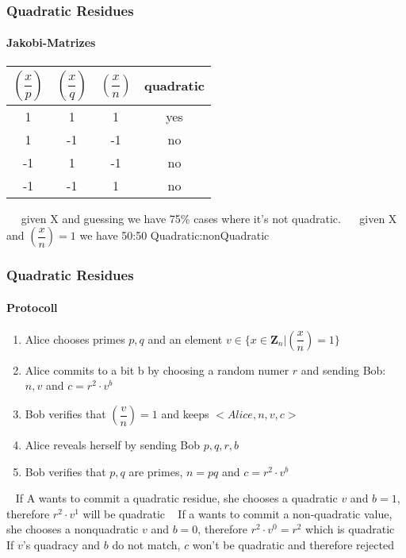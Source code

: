 \begin{frame}
	\frametitle{Quadratic Residues}
	\framesubtitle{Jakobi-Matrizes}
	\begin{LARGE}
		\begin{center}
			\begin{tabular}{|c|c|c|c|}
				$(\dfrac{x}{p})$&$(\dfrac{x}{q})$ &$(\dfrac{x}{n})$& quadratic \\ 
				\hline 
				1 & 1  & 1  & yes \\ 
				\hline 
				1 & -1  & -1  & no \\ 
				\hline 	
				-1 & 1  & -1  & no \\ 
				\hline 	
				-1 & -1  & 1  & no \\ 
				\hline 
			\end{tabular} 
		\end{center}
	\end{LARGE}
~\newline ~\newline
	given X and guessing we have 75\% cases where it's not quadratic. 
	~\newline ~\newline
	given X and $(\dfrac{x}{n})=1$ we have 50:50 Quadratic:nonQuadratic 
\end{frame}

\begin{frame}
	\frametitle{Quadratic Residues}
	\framesubtitle{Protocoll}
	\begin{Large}
		\begin{enumerate}
			\item Alice chooses primes $p,q$ and an element $v \in \{ x \in \mathbf{Z}_n | (\dfrac{x}{n}) = 1\}$ 
			\item Alice commits to a bit b by choosing a random numer $r$ and sending Bob: $n,v$ and $c = r^2\cdot v^b$
			\item Bob verifies that $(\dfrac{v}{n})=1$ and keeps $<Alice,n,v,c>$
			\item Alice reveals herself by sending Bob $p,q,r,b$
			\item Bob verifies that $p,q$ are primes, $n=pq$ and $c=r^2\cdot v^b$ 
		\end{enumerate}
	\end{Large}
~\newline
If A wants to commit a quadratic residue, she chooses a quadratic $v$ and $b=1$, therefore $r^2 \cdot v^1$ will be quadratic ~\newline
If a wants to commit a non-quadratic value, she chooses a nonquadratic $v$ and $b=0$, therefore $r^2 \cdot v^0 = r^2$ which is quadratic ~\newline
If $v$'s quadracy and $b$ do not match, $c$ won't be quadratic and therefore rejected
\end{frame}